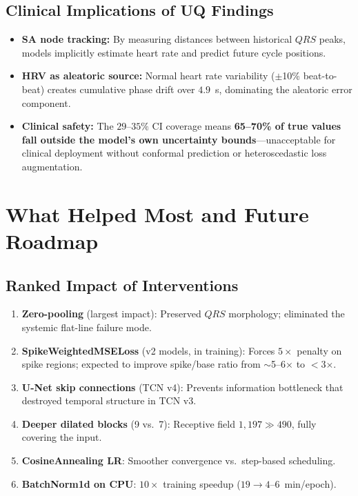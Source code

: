 \documentclass[10pt,journal,compsoc]{IEEEtran}
\begin{document}
\subsection{Clinical Implications of UQ Findings}

\begin{itemize}
    \item \textbf{SA node tracking:} By measuring distances between historical $QRS$ peaks, models implicitly estimate heart rate and predict future cycle positions.
    \item \textbf{HRV as aleatoric source:} Normal heart rate variability ($\pm$10\% beat-to-beat) creates cumulative phase drift over $4.9$~s, dominating the aleatoric error component.
    \item \textbf{Clinical safety:} The $29$--$35\%$ CI coverage means \textbf{65--70\% of true values fall outside the model's own uncertainty bounds}---unacceptable for clinical deployment without conformal prediction or heteroscedastic loss augmentation.
\end{itemize}

\section{What Helped Most and Future Roadmap}
\label{sec:future}

\subsection{Ranked Impact of Interventions}
\begin{enumerate}
    \item \textbf{Zero-pooling} (largest impact): Preserved $QRS$ morphology; eliminated the systemic flat-line failure mode.
    \item \textbf{SpikeWeightedMSELoss} (v2 models, in training): Forces $5\times$ penalty on spike regions; expected to improve spike/base ratio from $\sim$5--6$\times$ to $<$3$\times$.
    \item \textbf{U-Net skip connections} (TCN v4): Prevents information bottleneck that destroyed temporal structure in TCN v3.
    \item \textbf{Deeper dilated blocks} (9 vs.\ 7): Receptive field $1{,}197 \gg 490$, fully covering the input.
    \item \textbf{CosineAnnealing LR}: Smoother convergence vs.\ step-based scheduling.
    \item \textbf{BatchNorm1d on CPU}: $10\times$ training speedup ($19 \to 4$--$6$~min/epoch).
\end{enumerate}
\end{document}
